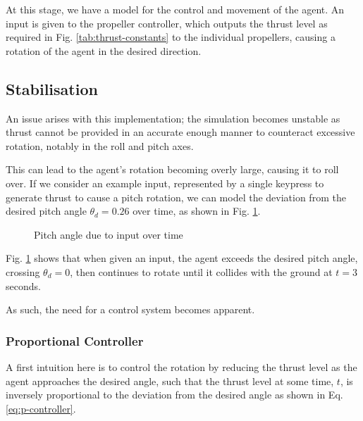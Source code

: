 \documentclass[12pt]{article}
\begin{document}
At this stage, we have a model for the control and movement of the agent. An input is given to the propeller controller, which outputs the thrust level as required in Fig. \ref{tab:thrust-constants} to the individual propellers, causing a rotation of the agent in the desired direction.


\subsection{Stabilisation}
\label{sec:stabilisation}

An issue arises with this implementation; the simulation becomes unstable as thrust cannot be provided in an accurate enough manner to counteract excessive rotation, notably in the roll and pitch axes.

This can lead to the agent's rotation becoming overly large, causing it to roll over. If we consider an example input, represented by a single keypress to generate thrust to cause a pitch rotation, we can model the deviation from the desired pitch angle $\theta_{d} = 0.26$ over time, as shown in Fig. \ref{fig:pitch-angle}.

\begin{figure}[H]
\centering
{}
\caption{Pitch angle due to input over time}
\label{fig:pitch-angle}
\end{figure}

Fig. \ref{fig:pitch-angle} shows that when given an input, the agent exceeds the desired pitch angle, crossing $\theta_d = 0$, then continues to rotate until it collides with the ground at $t = 3$ seconds.

As such, the need for a control system becomes apparent. 

\subsubsection{Proportional Controller}
A first intuition here is to control the rotation by reducing the thrust level as the agent approaches the desired angle, such that the thrust level at some time, $t$, is inversely proportional to the deviation from the desired angle as shown in Eq. \ref{eq:p-controller}.
\end{document}
